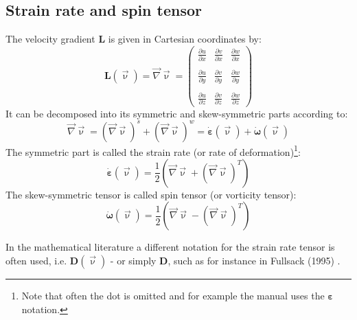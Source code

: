 \subsection{Strain rate and spin tensor} \label{ss:srst}

The velocity gradient ${\bm L}$ is given in Cartesian coordinates by:
\begin{equation}
{\bm L}(\vec\upnu)=
\vec\nabla\vec\upnu = 
\left(
\begin{array}{ccc}
\frac{\partial u}{\partial x} & \frac{\partial v}{\partial x} & \frac{\partial w}{\partial x} \\\\
\frac{\partial u}{\partial y} & \frac{\partial v}{\partial y} & \frac{\partial w}{\partial y} \\\\
\frac{\partial u}{\partial z} & \frac{\partial v}{\partial z} & \frac{\partial w}{\partial z} 
\end{array}
\right)
\end{equation}
It can be decomposed into its symmetric and skew-symmetric parts according to:
\begin{equation}
\vec\nabla\vec\upnu = (\vec\nabla\vec\upnu)^s + (\vec\nabla\vec\upnu)^w 
= \dot{\bm \varepsilon}(\vec \upnu) +  \dot{\bm \omega}(\vec \upnu)
\end{equation}
The symmetric part is called the strain rate (or rate of deformation)\footnote{Note that often the dot is omitted and for example the \aspect manual uses the ${\bm \varepsilon}$ notation.}:
\begin{equation}
\dot{\bm \varepsilon}(\vec \upnu) = \frac{1}{2}\left( \vec\nabla\vec\upnu + (\vec\nabla\vec\upnu)^T \right)
\end{equation}
The skew-symmetric tensor is called spin tensor (or vorticity tensor):
\begin{equation}
\dot{\bm \omega}(\vec \upnu) = \frac{1}{2}\left( \vec\nabla\vec\upnu - (\vec\nabla\vec\upnu)^T \right)
\end{equation}

\begin{remark}
In the mathematical literature a different notation for the strain rate tensor is often used, i.e. 
${\bm D}(\vec \upnu)$ - or simply ${\bm D}$, such as for instance in Fullsack (1995) \cite{full95}.
\end{remark}

